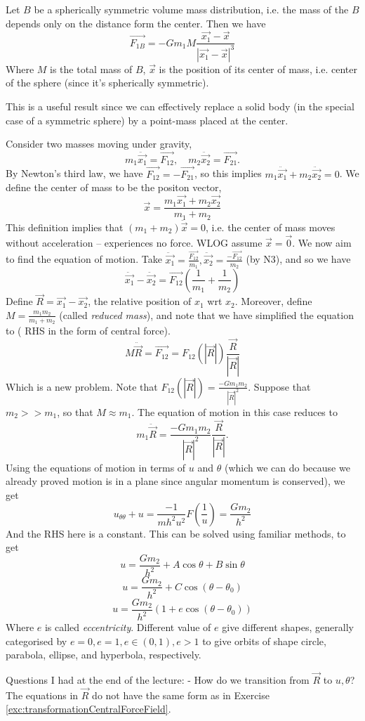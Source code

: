 \begin{theorem}
  Let $B$ be a spherically symmetric volume mass distribution, i.e. the mass of
  the $B$ depends only on the distance form the center. Then we have
  \[\vec{F_{1B}} = -Gm_1 M \frac{\vec{x_1}-\vec{x}}{|\vec{x_1}-\vec{x}|^3}\]
  Where $M$ is the total mass of $B$, $\vec{x}$ is the position of its center of
  mass, i.e. center of the sphere (since it's spherically symmetric).
  \label{thm:newtonShellThm}
\end{theorem}
This is a useful result since we can effectively replace a solid body (in the
special case of a symmetric sphere) by a point-mass placed at the center.
\begin{example}
  Consider two masses moving under gravity,
  \[m_1\ddot{\vec{x_1}} = \vec{F_{12}}, \quad m_2\ddot{\vec{x_2}} =
  \vec{F_{21}}.\]
  By Newton's third law, we have $\vec{F_{12}} = -\vec{F_{21}}$, so this implies
  $m_1\ddot{\vec{x_1}} + m_2\ddot{\vec{x_2}}=0$. We define the center of mass to
  be the positon vector,
  \[\vec{x}= \frac{m_1\vec{x_1} + m_2\vec{x_2}}{m_1+m_2}\]
  This definition implies that $(m_1+m_2)\ddot{\vec{x}} = 0$, i.e. the center of mass
  moves without acceleration -- experiences no force. WLOG assume
  $\vec{x}=\vec{0}$. We now aim to find the equation of motion. Take
  $\ddot{\vec{x_1}}= \frac{\vec{F_{12}}}{m_1}, \ddot{\vec{x_2}}=
  \frac{-\vec{F_{12}}}{m_2}$ (by N3), and so we have 
  \[\ddot{\vec{x_1}}-\ddot{\vec{x_2}} = \vec{F_{12}} (\frac{1}{m_1}+\frac{1}{m_2})\]
  Define $\vec{R}= \vec{x_1}-\vec{x_2}$, the relative position of $x_1$ wrt
  $x_2$. Moreover, define $M=\frac{m_1m_2}{m_1+m_2}$ (called \emph{reduced
  mass}), and note that we have simplified the equation to ( RHS in the form of
  central force).
  \[M\ddot{\vec{R}} = \vec{F_{12}} = F_{12}(|\vec{R}|) \frac{\vec{R}}{|\vec{R}|}\] 
  Which is a new problem. Note that $F_{12}(|\vec{R}|)=
  \frac{-Gm_1m_2}{|\vec{R}|^2}$. Suppose that $m_2>>m_1$, so that $M\approx
  m_1$. The equation of motion in this case reduces to 
  \[m_1\ddot{\vec{R}} = \frac{-Gm_1m_2}{|\vec{R}|^2} \frac{\vec{R}}{|\vec{R}|}.\]
  Using the equations of motion in terms of $u$ and $\theta$ (which we can do
  because we already proved motion is in a plane since angular momentum is
  conserved), we get
  \[u_{\theta\theta}+u = \frac{-1}{mh^2u^2} F(\frac{1}{u}) =
  \frac{Gm_2}{h^2}\]
  And the RHS here is a constant. This can be solved using familiar methods, to
  get 
  \[u=\frac{Gm_2}{h^2} + A\cos\theta + B\sin\theta\]
  \[u = \frac{Gm_2}{h^2} + C\cos(\theta-\theta_0)\]
  \[u= \frac{Gm_2}{h^2}\left( 1+e\cos(\theta-\theta_0) \right)\]
  Where $e$ is called \emph{eccentricity}. Different value of $e$ give different
  shapes, generally categorised by $e=0, e=1, e\in(0,1), e>1$ to give orbits of
  shape circle, parabola, ellipse, and hyperbola, respectively.
\end{example}
Questions I had at the end of the lecture:
- How do we transition from $\vec{R}$ to $u,\theta$? The equations in $\vec{R}$
do not have the same form as in Exercise
\ref{exc:transformationCentralForceField}.
